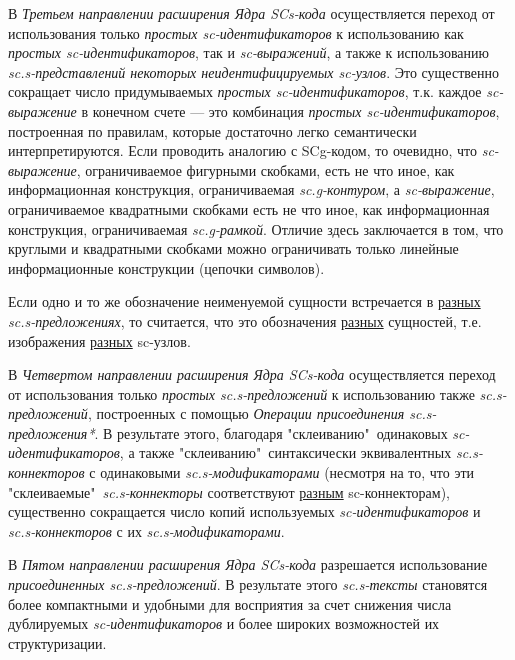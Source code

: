 В \textit{Третьем направлении расширения Ядра SCs-кода} осуществляется переход от использования только \textit{простых sc-идентификаторов} к использованию как \textit{простых sc-идентификаторов}, так и \textit{sc-выражений}, а также к использованию \textit{sc.s-представлений некоторых неидентифицируемых sc-узлов}. Это существенно сокращает число придумываемых \textit{простых sc-идентификаторов}, т.к. каждое \textit{sc-выражение} в конечном счете — это комбинация \textit{простых sc-идентификаторов}, построенная по правилам, которые достаточно легко семантически интерпретируются. Если проводить аналогию с SCg-кодом, то очевидно, что \textit{\mbox{sc-выражение}}, ограничиваемое фигурными скобками, есть не что иное, как информационная конструкция, ограничиваемая \textit{sc.g-контуром}, а \textit{sc-выражение}, ограничиваемое квадратными скобками есть не что иное, как информационная конструкция, ограничиваемая \textit{sc.g-рамкой}. Отличие здесь заключается в том, что круглыми и квадратными скобками можно ограничивать только линейные информационные конструкции (цепочки символов).

\begin{SCn}
\end{SCn}

Если одно и то же обозначение неименуемой сущности встречается в \uline{разных} \textit{sc.s-предложениях}, то считается, что это обозначения \uline{разных} сущностей, т.е. изображения \uline{разных} sc-узлов.

\begin{SCn}
В \textit{Четвертом направлении расширения Ядра SCs-кода} осуществляется переход от использования только \textit{простых sc.s-предложений} к использованию также \textit{sc.s-предложений}, построенных с помощью \textit{\mbox{Операции} присоединения sc.s-предложения*}. В результате этого, благодаря "склеиванию"\ одинаковых \textit{\mbox{sc-идентификаторов}}, а также "склеиванию"\ синтаксически эквивалентных \textit{\mbox{sc.s-коннекторов}} с одинаковыми \textit{\mbox{sc.s-модификаторами}} (несмотря на то, что эти "склеиваемые"\ \textit{sc.s-коннекторы} соответствуют \uline{разным} \mbox{sc-коннекторам}), существенно сокращается число копий используемых \textit{\mbox{sc-идентификаторов}} и \textit{\mbox{sc.s-коннекторов}} с их \textit{\mbox{sc.s-модификаторами}}.

В \textit{Пятом направлении расширения Ядра SCs-кода} разрешается использование \textit{присоединенных \mbox{sc.s-предложений}}. В результате этого \textit{sc.s-тексты} становятся более компактными и удобными для восприятия за счет снижения числа дублируемых \textit{sc-идентификаторов} и более широких возможностей их структуризации.
\end{SCn}


